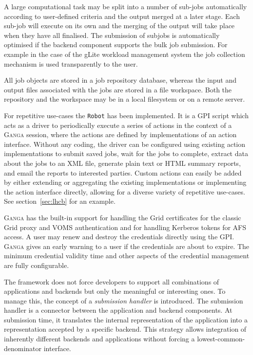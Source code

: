 \documentclass{elsart}
\def\ganga {\textsc{Ganga}\xspace}
\def\GPI{GPI\xspace}
\newcommand{\code}[1]{\texttt{#1}}
\begin{document}
A large computational task may be split into a number of sub-jobs
automatically according to user-defined criteria and the output merged
at a later stage. Each sub-job will execute on its own and the merging
of the output will take place when they have all finalised. The
submission of subjobs is automatically optimised if the backend
component supports the bulk job submission. For example in the case of
the gLite \cite{LCG} workload management system the job collection
mechanism is used transparently to the user.

All job objects are stored in a job repository database, whereas the input
and output files associated with the jobs are stored in a file workspace. Both
the repository and the workspace may be in a local filesystem or on a remote
server.

For repetitive use-cases the \code{Robot} has been implemented. It is a \GPI
script which acts as a driver to periodically execute a series of
actions in the context of a \ganga session, where the actions are defined by
implementations of an action interface.  Without any coding, the driver can be
configured using existing action implementations to submit saved jobs, wait
for the jobs to complete, extract data about the jobs to an XML file, generate
plain text or HTML summary reports, and email the reports to interested
parties. Custom actions can easily be added by either extending or aggregating
the existing implementations or implementing the action interface directly,
allowing for a diverse variety of repetitive use-cases. See
section~\ref{sec:lhcb} for an example.


\ganga has the built-in support for handling the Grid certificates for
the classic Grid proxy and VOMS \cite{VOMS} authentication and for
handling Kerberos\cite{Kerberos} tokens for AFS \cite{AFS} access. A
user may renew and destroy the credentials directly using the
GPI. \ganga gives an early warning to a user if the credentials are
about to expire. The minimum credential validity time and other
aspects of the credential management are fully configurable.

The framework does not force developers to support all combinations of
applications and backends but only the meaningful or interesting ones. To manage
this, the concept of a {\em submission handler} is introduced. The submission
handler is a connector between the application and backend components. At
submission time, it translates the internal representation of the application
into a representation accepted by a specific backend. This strategy allows
integration of inherently different backends and applications without forcing
a lowest-common-denominator interface.
\end{document}
